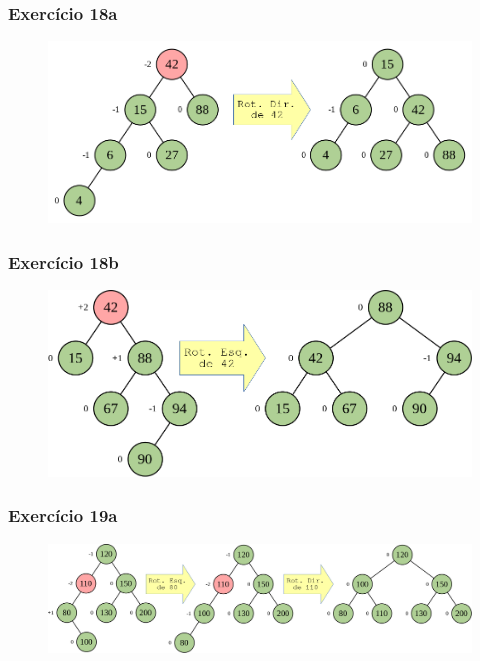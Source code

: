 \documentclass[aspectratio=169]{beamer}
\begin{document}
\begin{frame}[fragile]\frametitle{Exercício 18a}
\begin{figure}[h]
	\centering
	\includegraphics[height=0.40\paperheight]{imagens/avl15-add4.png}
\end{figure}
\end{frame}

\begin{frame}[fragile]\frametitle{Exercício 18b}
\begin{figure}[h]
	\centering
	\includegraphics[height=0.40\paperheight]{imagens/avl16-add90.png}
\end{figure}
\end{frame}

\begin{frame}[fragile]\frametitle{Exercício 19a}
\begin{figure}[h]
	\centering
	\includegraphics[height=0.40\paperheight]{imagens/avl17-rotesqdir110.png}
\end{figure}
\end{frame}
	
\end{document}

